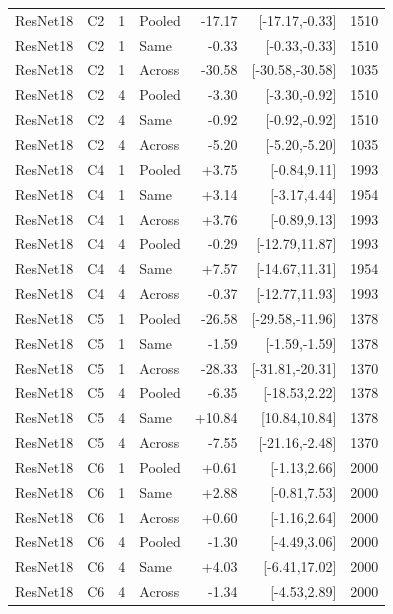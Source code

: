 \begin{longtable}{llrlrrr}
ResNet18 & C2 & 1 & Pooled & -17.17 & [-17.17,-0.33] & 1510 \\
ResNet18 & C2 & 1 & Same & -0.33 & [-0.33,-0.33] & 1510 \\
ResNet18 & C2 & 1 & Across & -30.58 & [-30.58,-30.58] & 1035 \\
ResNet18 & C2 & 4 & Pooled & -3.30 & [-3.30,-0.92] & 1510 \\
ResNet18 & C2 & 4 & Same & -0.92 & [-0.92,-0.92] & 1510 \\
ResNet18 & C2 & 4 & Across & -5.20 & [-5.20,-5.20] & 1035 \\
ResNet18 & C4 & 1 & Pooled & +3.75 & [-0.84,9.11] & 1993 \\
ResNet18 & C4 & 1 & Same & +3.14 & [-3.17,4.44] & 1954 \\
ResNet18 & C4 & 1 & Across & +3.76 & [-0.89,9.13] & 1993 \\
ResNet18 & C4 & 4 & Pooled & -0.29 & [-12.79,11.87] & 1993 \\
ResNet18 & C4 & 4 & Same & +7.57 & [-14.67,11.31] & 1954 \\
ResNet18 & C4 & 4 & Across & -0.37 & [-12.77,11.93] & 1993 \\
ResNet18 & C5 & 1 & Pooled & -26.58 & [-29.58,-11.96] & 1378 \\
ResNet18 & C5 & 1 & Same & -1.59 & [-1.59,-1.59] & 1378 \\
ResNet18 & C5 & 1 & Across & -28.33 & [-31.81,-20.31] & 1370 \\
ResNet18 & C5 & 4 & Pooled & -6.35 & [-18.53,2.22] & 1378 \\
ResNet18 & C5 & 4 & Same & +10.84 & [10.84,10.84] & 1378 \\
ResNet18 & C5 & 4 & Across & -7.55 & [-21.16,-2.48] & 1370 \\
ResNet18 & C6 & 1 & Pooled & +0.61 & [-1.13,2.66] & 2000 \\
ResNet18 & C6 & 1 & Same & +2.88 & [-0.81,7.53] & 2000 \\
ResNet18 & C6 & 1 & Across & +0.60 & [-1.16,2.64] & 2000 \\
ResNet18 & C6 & 4 & Pooled & -1.30 & [-4.49,3.06] & 2000 \\
ResNet18 & C6 & 4 & Same & +4.03 & [-6.41,17.02] & 2000 \\
ResNet18 & C6 & 4 & Across & -1.34 & [-4.53,2.89] & 2000 \\
\bottomrule\end{longtable}\endgroup
